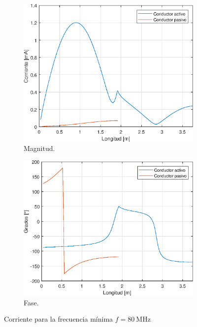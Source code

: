 \begin{figure}[H]
\begin{subfigure}{0.5\textwidth}
		\includegraphics[scale=0.6]{imagenes/i_mag_80_tierra.eps}
		\caption{Magnitud.}
	\end{subfigure}
	\quad
	\begin{subfigure}{0.5\textwidth}
		\includegraphics[scale=0.6]{imagenes/i_fase_80_tierra.eps}
		\caption{Fase.}
	\end{subfigure}
	\caption{Corriente para la frecuencia mínima $f = \SI{80}{\mega\hertz}$}
\end{figure}


